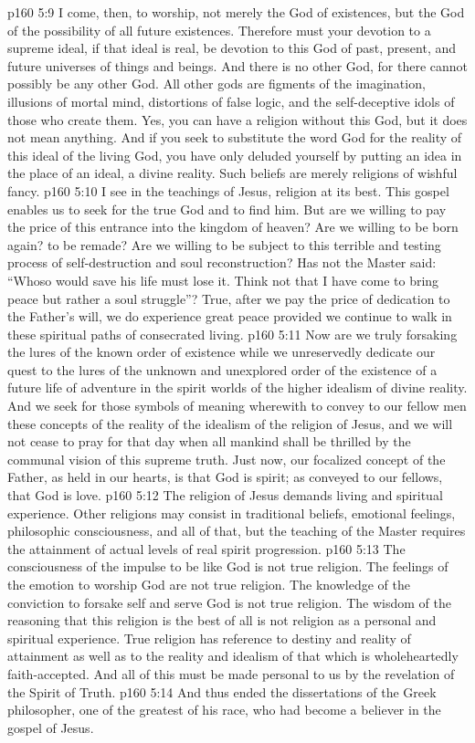 \vs p160 5:9 I come, then, to worship, not merely the God of existences, but the God of the possibility of all future existences. Therefore must your devotion to a supreme ideal, if that ideal is real, be devotion to this God of past, present, and future universes of things and beings. And there is no other God, for there cannot possibly be any other God. All other gods are figments of the imagination, illusions of mortal mind, distortions of false logic, and the self\hyp{}deceptive idols of those who create them. Yes, you can have a religion without this God, but it does not mean anything. And if you seek to substitute the word God for the reality of this ideal of the living God, you have only deluded yourself by putting an idea in the place of an ideal, a divine reality. Such beliefs are merely religions of wishful fancy.
\vs p160 5:10 I see in the teachings of Jesus, religion at its best. This gospel enables us to seek for the true God and to find him. But are we willing to pay the price of this entrance into the kingdom of heaven? Are we willing to be born again? to be remade? Are we willing to be subject to this terrible and testing process of self\hyp{}destruction and soul reconstruction? Has not the Master said: \textcolor{ubdarkred}{“Whoso would save his life must lose it. Think not that I have come to bring peace but rather a soul struggle”?} True, after we pay the price of dedication to the Father’s will, we do experience great peace provided we continue to walk in these spiritual paths of consecrated living.
\vs p160 5:11 Now are we truly forsaking the lures of the known order of existence while we unreservedly dedicate our quest to the lures of the unknown and unexplored order of the existence of a future life of adventure in the spirit worlds of the higher idealism of divine reality. And we seek for those symbols of meaning wherewith to convey to our fellow men these concepts of the reality of the idealism of the religion of Jesus, and we will not cease to pray for that day when all mankind shall be thrilled by the communal vision of this supreme truth. Just now, our focalized concept of the Father, as held in our hearts, is that God is spirit; as conveyed to our fellows, that God is love.
\vs p160 5:12 The religion of Jesus demands living and spiritual experience. Other religions may consist in traditional beliefs, emotional feelings, philosophic consciousness, and all of that, but the teaching of the Master requires the attainment of actual levels of real spirit progression.
\vs p160 5:13 The consciousness of the impulse to be like God is not true religion. The feelings of the emotion to worship God are not true religion. The knowledge of the conviction to forsake self and serve God is not true religion. The wisdom of the reasoning that this religion is the best of all is not religion as a personal and spiritual experience. True religion has reference to destiny and reality of attainment as well as to the reality and idealism of that which is wholeheartedly faith\hyp{}accepted. And all of this must be made personal to us by the revelation of the Spirit of Truth.
\vs p160 5:14 \pc And thus ended the dissertations of the Greek philosopher, one of the greatest of his race, who had become a believer in the gospel of Jesus.
